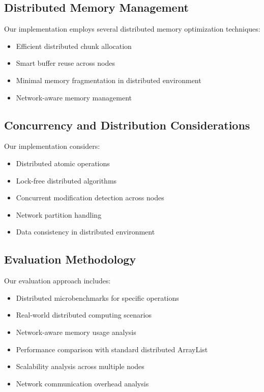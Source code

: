 \subsection{Distributed Memory Management}

Our implementation employs several distributed memory optimization techniques:
\begin{itemize}
    \item Efficient distributed chunk allocation
    \item Smart buffer reuse across nodes
    \item Minimal memory fragmentation in distributed environment
    \item Network-aware memory management
\end{itemize}

\subsection{Concurrency and Distribution Considerations}

Our implementation considers:
\begin{itemize}
    \item Distributed atomic operations
    \item Lock-free distributed algorithms
    \item Concurrent modification detection across nodes
    \item Network partition handling
    \item Data consistency in distributed environment
\end{itemize}

\subsection{Evaluation Methodology}

Our evaluation approach includes:
\begin{itemize}
    \item Distributed microbenchmarks for specific operations
    \item Real-world distributed computing scenarios
    \item Network-aware memory usage analysis
    \item Performance comparison with standard distributed ArrayList
    \item Scalability analysis across multiple nodes
    \item Network communication overhead analysis
\end{itemize} 